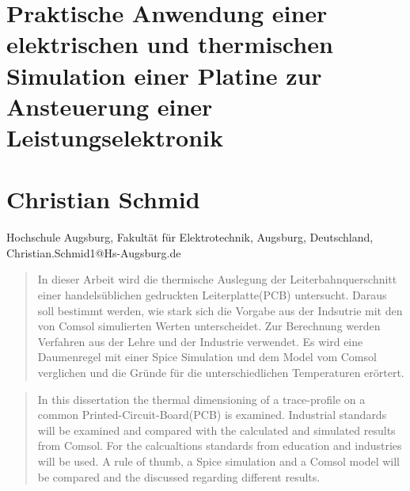 \documentclass[10pt,a4paper,oneside,abstracton]{scrartcl}
\begin{document}
\section*{Praktische Anwendung einer elektrischen und thermischen Simulation einer Platine zur Ansteuerung einer Leistungselektronik}
\section*{Christian Schmid}
Hochschule Augsburg, Fakultät für Elektrotechnik, Augsburg, Deutschland, Christian.Schmid1@Hs-Augsburg.de 


\begin{abstract} %
\noindent %
In dieser Arbeit wird die thermische Auslegung der Leiterbahnquerschnitt einer handelsüblichen gedruckten Leiterplatte(PCB) untersucht. 
Daraus soll bestimmt werden, wie stark sich die Vorgabe aus der Indsutrie mit den von Comsol simulierten Werten unterscheidet. 
Zur Berechnung werden Verfahren aus der Lehre und der Industrie verwendet. 
Es wird eine Daumenregel mit einer Spice Simulation und dem Model vom Comsol verglichen und die Gründe für die 
unterschiedlichen Temperaturen erörtert. 
\end{abstract}

\renewcommand{\abstractname}{Abstract} %

\begin{abstract}
\noindent %
In this dissertation the thermal dimensioning  of a trace-profile on a  common Printed-Circuit-Board(PCB) is examined.
Industrial standards will be examined and compared with the calculated and simulated results from Comsol.
For the calcualtions standards from education and industries will be used.  
A rule of thumb, a Spice simulation and a Comsol model will be compared and the discussed regarding different results. 
\end{abstract}
\end{document}
